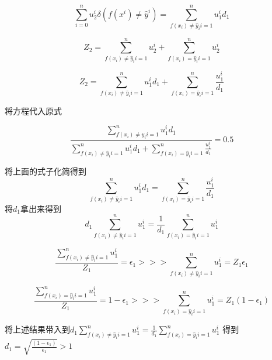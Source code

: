 \begin{equation*}
    \sum_{i=0}^{n} u_2^i \delta(f(x^i) \neq \hat{y}^i) = \sum_{f(x_i) \neq \hat{y}_i {i=1}}^n u_1^i d_1
\end{equation*}

\begin{equation*}
    Z_2 = \sum_{f(x_i) \neq \hat{y}_i {i=1}}^n u_2^i + \sum_{f(x_i) = \hat{y}_i {i=1}}^n u_2^i
\end{equation*}

\begin{equation*}
    Z_2 = \sum_{f(x_i) \neq \hat{y}_i {i=1}}^n u_1^i d_1 + \sum_{f(x_i) = \hat{y}_i {i=1}}^n \frac{u_1^i}{d_1}
\end{equation*}

将方程代入原式

\begin{equation*}
    \frac{ \sum_{f(x_i) \neq \hat{y}_i {i=1}}^n u_1^i d_1}{\sum_{f(x_i) \neq \hat{y}_i {i=1}}^n u_1^i d_1 + \sum_{f(x_i) = \hat{y}_i {i=1}}^n \frac{u_1^i}{d_1}}
    = 0.5
\end{equation*}


将上面的式子化简得到
\begin{equation*}
    \sum_{f(x_i) \neq \hat{y}_i {i=1}}^n u_1^i d_1 = \sum_{f(x_i) = \hat{y}_i {i=1}}^n \frac{u_1^i}{d_1}
\end{equation*}
将$d_1$拿出来得到
\begin{equation*}
    d_1\sum_{f(x_i) \neq \hat{y}_i {i=1}}^n u_1^i  =  \frac{1}{d_1}\sum_{f(x_i) = \hat{y}_i {i=1}}^n u_1^i
\end{equation*}

\begin{equation*}
    \frac{\sum_{f(x_i) \neq \hat{y}_i {i=1}}^n u_1^i}{Z_1} = \epsilon_1 >>> \sum_{f(x_i) \neq \hat{y}_i {i=1}}^n u_1^i = Z_1 \epsilon_1
\end{equation*}

\begin{equation*}
    \frac{\sum_{f(x_i) = \hat{y}_i {i=1}}^n u_1^i}{Z_1} = 1 - \epsilon_1 >>> \sum_{f(x_i) = \hat{y}_i {i=1}}^n u_1^i = Z_1 (1 - \epsilon_1)
\end{equation*}

将上述结果带入到$d_1\sum_{f(x_i) \neq \hat{y}_i {i=1}}^n u_1^i  =  \frac{1}{d_1}\sum_{f(x_i) = \hat{y}_i {i=1}}^n u_1^i$ 得到
$d_1 = \sqrt{\frac{(1 - \epsilon_1)}{\epsilon_1}} > 1$ 

